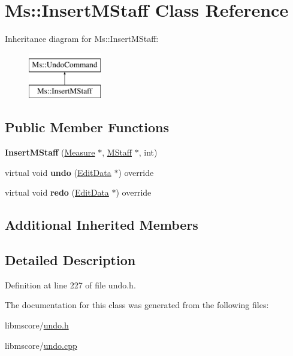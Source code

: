 \hypertarget{class_ms_1_1_insert_m_staff}{}\section{Ms\+:\+:Insert\+M\+Staff Class Reference}
\label{class_ms_1_1_insert_m_staff}
Inheritance diagram for Ms\+:\+:Insert\+M\+Staff\+:\begin{figure}[H]
\begin{center}
\leavevmode
\includegraphics[height=2.000000cm]{class_ms_1_1_insert_m_staff}
\end{center}
\end{figure}
\subsection*{Public Member Functions}
\begin{DoxyCompactItemize}
\item 
\mbox{\label{class_ms_1_1_insert_m_staff_a41fb1849ff2059fd3b9775fa710a2a03}} 
{\bfseries Insert\+M\+Staff} (\hyperlink{class_ms_1_1_measure}{Measure} $\ast$, \hyperlink{class_ms_1_1_m_staff}{M\+Staff} $\ast$, int)
\item 
\mbox{\label{class_ms_1_1_insert_m_staff_a1bd4d0856025c03bb68239f30cc9bf52}} 
virtual void {\bfseries undo} (\hyperlink{class_ms_1_1_edit_data}{Edit\+Data} $\ast$) override
\item 
\mbox{\label{class_ms_1_1_insert_m_staff_ac4717535584d521881ae99b9e241234f}} 
virtual void {\bfseries redo} (\hyperlink{class_ms_1_1_edit_data}{Edit\+Data} $\ast$) override
\end{DoxyCompactItemize}
\subsection*{Additional Inherited Members}


\subsection{Detailed Description}


Definition at line 227 of file undo.\+h.



The documentation for this class was generated from the following files\+:\begin{DoxyCompactItemize}
\item 
libmscore/\hyperlink{undo_8h}{undo.\+h}\item 
libmscore/\hyperlink{undo_8cpp}{undo.\+cpp}\end{DoxyCompactItemize}
